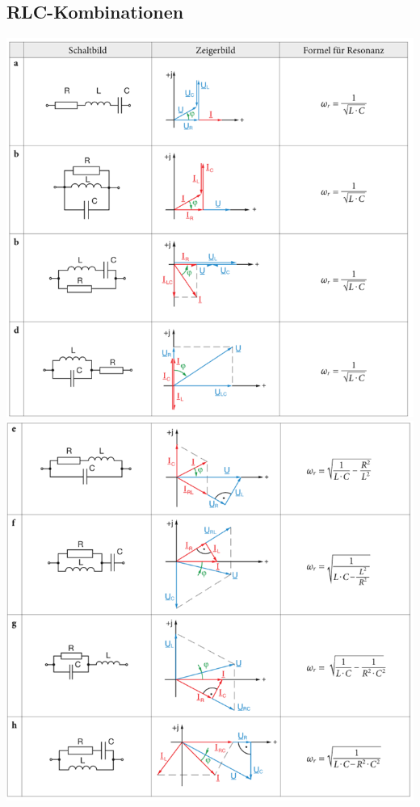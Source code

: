 \subsection{RLC-Kombinationen}
\begin{center}
\includegraphics[width=.75\linewidth]{LineareBauteile/RLC-1.png}
\vspace{0.5cm} \\
\includegraphics[width=.75\linewidth]{LineareBauteile/RLC-2.png}
\end{center}




